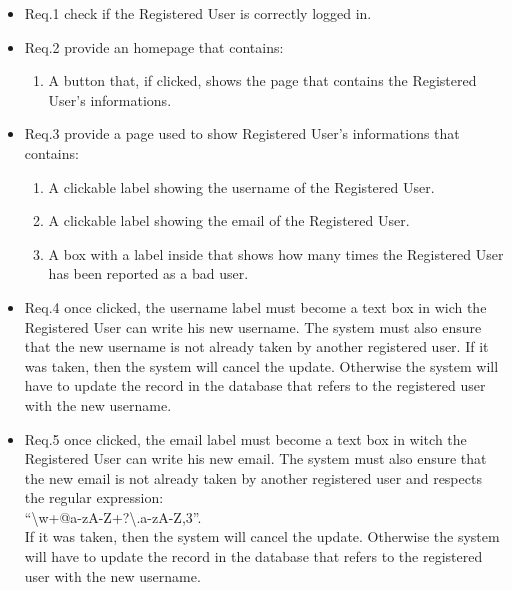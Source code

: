 \documentclass{report}
\begin{document}
				\begin{itemize}
					\item \lbrack Req.1\rbrack \label{sec:fr1_g5} check if the Registered User is correctly logged in.
					\item \lbrack Req.2\rbrack \label{sec:fr2_g5} provide an homepage that contains:
						\begin{enumerate}
							\item A button that, if clicked, shows the page that contains the Registered User's informations.
						\end{enumerate}
					\item \lbrack Req.3\rbrack \label{sec:fr3_g5} provide a page used to show Registered User's informations that contains:
						\begin{enumerate}
							\item A clickable label showing the username of the Registered User.
							\item A clickable label showing the email of the Registered User.
							\item A box with a label inside that shows how many times the Registered User has been reported as a bad user.
						\end{enumerate}
					\item \lbrack Req.4\rbrack \label{sec:fr4_g5} once clicked, the username label must become a text box in wich the Registered User can write his new username. The system must also ensure that the new username is not already taken by another registered user. If it was taken, then the system will cancel the update. Otherwise the system will have to update the record in the database that refers to the registered user with the new username.
					\item \lbrack Req.5\rbrack \label{sec:fr5_g5} once clicked, the email label must become a text box in witch the Registered User can write his new email. The system must also ensure that the new email is not already taken by another registered user and respects the regular expression:\\ \textquotedblleft\textbackslash w+@\lbrack a-zA-Z\textunderscore\rbrack +?\textbackslash .\lbrack a-zA-Z\rbrack{},3\textbraceright\textdollar\textquotedblright.\\ If it was taken, then the system will cancel the update. Otherwise the system will have to update the record in the database that refers to the registered user with the new username.
				\end{itemize}
\end{document}
